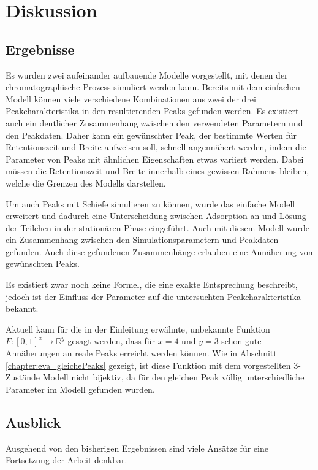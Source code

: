 \chapter{Diskussion}
\label{chapter:dis}

\section{Ergebnisse}
Es wurden zwei aufeinander aufbauende Modelle vorgestellt, mit denen der chromatographische Prozess simuliert werden kann. Bereits mit dem einfachen Modell können viele verschiedene Kombinationen aus zwei der drei Peakcharakteristika in den resultierenden Peaks gefunden werden. Es existiert auch ein deutlicher Zusammenhang zwischen den verwendeten Parametern und den Peakdaten. Daher kann ein gewünschter Peak, der bestimmte Werten für Retentionszeit und Breite aufweisen soll, schnell angennähert werden, indem die Parameter von Peaks mit ähnlichen Eigenschaften etwas variiert werden. Dabei müssen die Retentionszeit und Breite innerhalb eines gewissen Rahmens bleiben, welche die Grenzen des Modells darstellen.

Um auch Peaks mit Schiefe simulieren zu können, wurde das einfache Modell erweitert und dadurch eine Unterscheidung zwischen Adsorption an und Lösung der Teilchen in der stationären Phase eingeführt. Auch mit diesem Modell wurde ein Zusammenhang zwischen den Simulationsparametern und Peakdaten gefunden. Auch diese gefundenen Zusammenhänge erlauben eine Annäherung von gewünschten Peaks.

Es existiert zwar noch keine Formel, die eine exakte Entsprechung beschreibt, jedoch ist der Einfluss der Parameter auf die untersuchten Peakcharakteristika bekannt. 

Aktuell kann für die in der Einleitung erwähnte, unbekannte Funktion  $F: [0,1] ^ x \rightarrow \mathbb{R}^y$ gesagt werden, dass für $x = 4$ und $y = 3$ schon gute Annäherungen an reale Peaks erreicht werden können.
Wie in Abschnitt \ref{chapter:eva_gleichePeaks} gezeigt, ist diese Funktion mit dem vorgestellten 3-Zustände Modell nicht bijektiv, da für den gleichen Peak völlig unterschiedliche Parameter im Modell gefunden wurden.


\section{Ausblick}
Ausgehend von den bisherigen Ergebnissen sind viele Ansätze für eine Fortsetzung der Arbeit denkbar.

